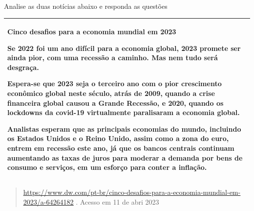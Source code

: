 {


Analise as duas notícias abaixo e responda as questões

\begin{longtable}[]{@{}
  >{\raggedright\arraybackslash}p{}@{}}
\toprule
\endhead
\textbf{Cinco desafios para a economia mundial em 2023}

Se 2022 foi um ano difícil para a economia global, 2023 promete ser
ainda pior, com uma recessão a caminho. Mas nem tudo será desgraça.

Espera-se que 2023 seja o terceiro ano com o pior crescimento econômico
global neste século, atrás de 2009, quando a crise financeira global
causou a Grande Recessão, e 2020, quando os lockdowns da covid-19
virtualmente paralisaram a economia global.

Analistas esperam que as principais economias do mundo, incluindo os
Estados Unidos e o Reino Unido, assim como a zona do euro, entrem em
recessão este ano, já que os bancos centrais continuam aumentando as
taxas de juros para moderar a demanda por bens de consumo e serviços, em
um esforço para conter a inflação. \\
\bottomrule
\end{longtable}

\begin{quote}
\href{https://www.dw.com/pt-br/cinco-desafios-para-a-economia-mundial-em-2023/a-64264182}{\uline{https://www.dw.com/pt-br/cinco-desafios-para-a-economia-mundial-em-2023/a-64264182}}
. Acesso em 11 de abri 2023
\end{quote}

}
